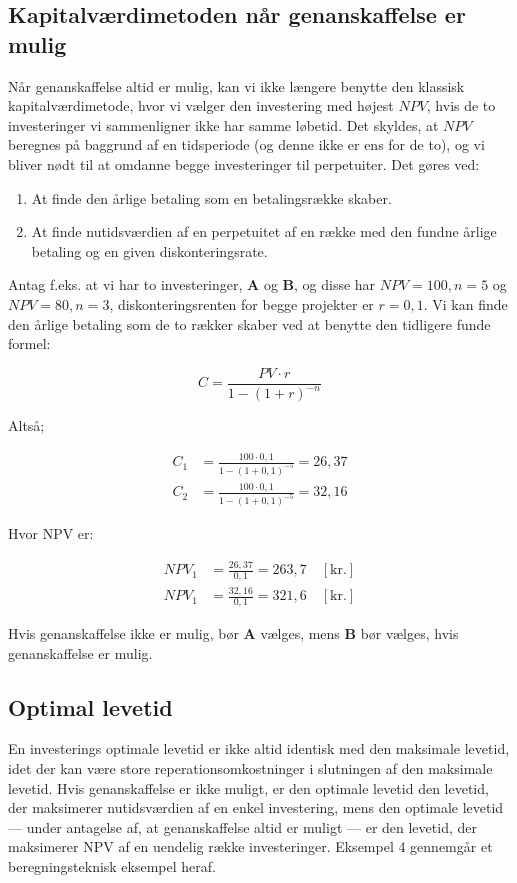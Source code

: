 \documentclass[10pt,reqno, usenames]{article}
\begin{document}
\subsection{Kapitalværdimetoden når genanskaffelse er mulig}
Når genanskaffelse altid er mulig, kan vi ikke længere benytte den klassisk kapitalværdimetode, hvor vi vælger den investering med højest $NPV$, hvis de to investeringer vi sammenligner ikke har samme løbetid. Det skyldes, at $NPV$ beregnes på baggrund af en tidsperiode (og denne ikke er ens for de to), og vi bliver nødt til at omdanne begge investeringer til perpetuiter. Det gøres ved: 
\begin{enumerate}
    \item At finde den årlige betaling som en betalingsrække skaber. 
    \item At finde nutidsværdien af en perpetuitet af en række med den fundne årlige betaling og en given diskonteringsrate.
\end{enumerate}

Antag f.eks. at vi har to investeringer, \textbf{A} og \textbf{B}, og disse har $NPV=100, n=5$ og $NPV=80, n=3$, diskonteringsrenten for begge projekter er $r=0,1$. Vi kan finde den årlige betaling som de to rækker skaber ved at benytte den tidligere funde formel: 

\begin{equation}
    C = \frac{PV \cdot r}{1 - (1 + r)^{-n}}
\end{equation}

Altså; 

\begin{align*}
    C_1 &= \frac{100 \cdot 0,1}{1 - (1 + 0,1)^{-5}} = 26,37 \\
    C_2 &= \frac{100 \cdot 0,1}{1 - (1 + 0,1)^{-5}} = 32,16
\end{align*}

Hvor NPV er: 

\begin{align*}
    NPV_1 &= \frac{26,37}{0,1} = 263,7 \quad [\text{kr.}] \\
    NPV_1 &= \frac{32,16}{0,1} = 321,6 \quad [\text{kr.}]
\end{align*}

Hvis genanskaffelse  ikke er mulig, bør \textbf{A} vælges, mens \textbf{B} bør vælges, hvis genanskaffelse er mulig.

\subsection{Optimal levetid}
En investerings optimale levetid er ikke altid identisk med den maksimale levetid, idet der kan være store reperationsomkostninger i slutningen af den maksimale levetid. Hvis genanskaffelse er ikke muligt, er den optimale levetid den levetid, der maksimerer nutidsværdien af en enkel investering, mens den optimale levetid — under antagelse af, at genanskaffelse altid er muligt — er den levetid, der maksimerer NPV af en uendelig række investeringer. Eksempel 4 gennemgår et beregningsteknisk eksempel heraf. 
\end{document}
